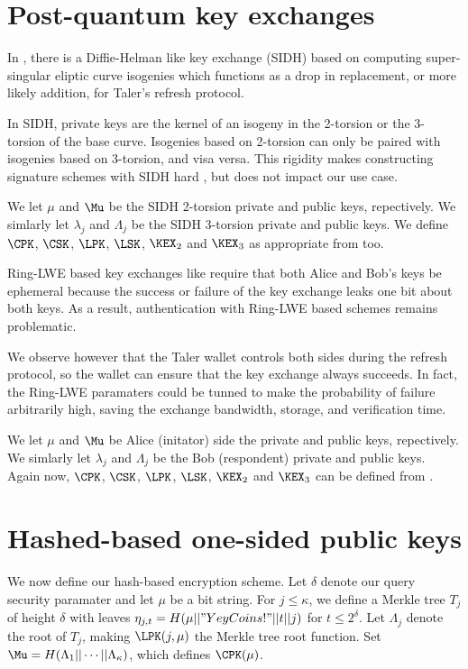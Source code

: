 \documentclass{llncs}
\begin{document}
\section{Post-quantum key exchanges}

In \cite{SIDH}, there is a Diffie-Helman like key exchange (SIDH)
based on computing super-singular eliptic curve isogenies which
functions as a drop in replacement, or more likely addition, for
Taler's refresh protocol.

In SIDH, private keys are the kernel of an isogeny in the 2-torsion
or the 3-torsion of the base curve.  Isogenies based on 2-torsion can
only be paired with isogenies based on 3-torsion, and visa versa.  
This rigidity makes constructing signature schemes with SIDH hard
\cite{}, but does not impact our use case.  

We let $\mu$ and $\Mu$ be the SIDH 2-torsion private and public keys,
repectively.  We simlarly let $\lambda_j$ and $\Lambda_j$ be the
SIDH 3-torsion private and public keys.  
We define $\CPK$, $\CSK$, $\LPK$, $\LSK$, $\KEX_2$ and $\KEX_3$
 as appropriate from \cite{SIDH} too.  

\smallskip

Ring-LWE based key exchanges like \cite{Peikert14,NewHope} require
that both Alice and Bob's keys be ephemeral because the success or
failure of the key exchange leaks one bit about both keys\cite{}.
As a result, authentication with Ring-LWE based schemes remains
problematic\cite{}.

We observe however that the Taler wallet controls both sides during 
the refresh protocol, so the wallet can ensure that the key exchange 
always succeeds.  In fact, the Ring-LWE paramaters could be tunned to
make the probability of failure arbitrarily high, saving the exchange
bandwidth, storage, and verification time.


We let $\mu$ and $\Mu$ be Alice (initator) side the private and public
keys, repectively.  We simlarly let $\lambda_j$ and $\Lambda_j$ be the
Bob (respondent) private and public keys. 
Again now, $\CPK$, $\CSK$, $\LPK$, $\LSK$, $\KEX_2$ and $\KEX_3$
can be defined from \cite{Peikert14,NewHope}.  %


\section{Hashed-based one-sided public keys}

We now define our hash-based encryption scheme.
Let $\delta$ denote our query security paramater and
 let $\mu$ be a bit string.
For $j \le \kappa$, we define a Merkle tree $T_j$ of height $\delta$
with leaves $\eta_{j,t} = H(\mu || "YeyCoins!" || t || j)$
 for $t \le 2^\delta$.
Let $\Lambda_j$ denote the root of $T_j$, making
 $\LPK(j,\mu)$ the Merkle tree root function.
Set $\Mu = H(\Lambda_1 || \cdots || \Lambda_\kappa)$,
 which defines $\CPK(\mu)$.
\end{document}
